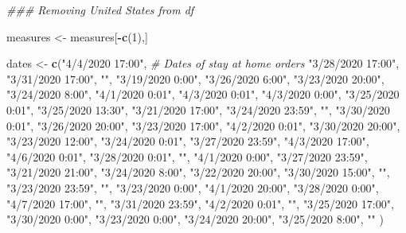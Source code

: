 \documentclass[
]{article}
\newenvironment{Shaded}{\begin{snugshade}}{\end{snugshade}}
\newcommand{\CommentTok}[1]{\textcolor[rgb]{0.56,0.35,0.01}{\textit{#1}}}
\newcommand{\DecValTok}[1]{\textcolor[rgb]{0.00,0.00,0.81}{#1}}
\newcommand{\KeywordTok}[1]{\textcolor[rgb]{0.13,0.29,0.53}{\textbf{#1}}}
\newcommand{\NormalTok}[1]{#1}
\newcommand{\OperatorTok}[1]{\textcolor[rgb]{0.81,0.36,0.00}{\textbf{#1}}}
\newcommand{\StringTok}[1]{\textcolor[rgb]{0.31,0.60,0.02}{#1}}
\begin{document}
\begin{Shaded}
\begin{Highlighting}[]
\CommentTok{### Removing United States from df}

\NormalTok{measures <-}\StringTok{ }\NormalTok{measures[}\OperatorTok{-}\KeywordTok{c}\NormalTok{(}\DecValTok{1}\NormalTok{),]}

\NormalTok{dates <-}\StringTok{ }\KeywordTok{c}\NormalTok{(}\StringTok{"4/4/2020 17:00"}\NormalTok{, }\CommentTok{# Dates of stay at home orders}
           \StringTok{"3/28/2020 17:00"}\NormalTok{,}
           \StringTok{"3/31/2020 17:00"}\NormalTok{,}
           \StringTok{""}\NormalTok{,}
           \StringTok{"3/19/2020 0:00"}\NormalTok{,}
           \StringTok{"3/26/2020 6:00"}\NormalTok{,}
           \StringTok{"3/23/2020 20:00"}\NormalTok{,}
           \StringTok{"3/24/2020 8:00"}\NormalTok{,}
           \StringTok{"4/1/2020 0:01"}\NormalTok{,}
           \StringTok{"4/3/2020 0:01"}\NormalTok{,}
           \StringTok{"4/3/2020 0:00"}\NormalTok{,}
           \StringTok{"3/25/2020 0:01"}\NormalTok{,}
           \StringTok{"3/25/2020 13:30"}\NormalTok{,}
           \StringTok{"3/21/2020 17:00"}\NormalTok{,}
           \StringTok{"3/24/2020 23:59"}\NormalTok{,}
           \StringTok{""}\NormalTok{,}
           \StringTok{"3/30/2020 0:01"}\NormalTok{,}
           \StringTok{"3/26/2020 20:00"}\NormalTok{,}
           \StringTok{"3/23/2020 17:00"}\NormalTok{,}
           \StringTok{"4/2/2020 0:01"}\NormalTok{,}
           \StringTok{"3/30/2020 20:00"}\NormalTok{,}
           \StringTok{"3/23/2020 12:00"}\NormalTok{,}
           \StringTok{"3/24/2020 0:01"}\NormalTok{,}
           \StringTok{"3/27/2020 23:59"}\NormalTok{,}
           \StringTok{"4/3/2020 17:00"}\NormalTok{,}
           \StringTok{"4/6/2020 0:01"}\NormalTok{,}
           \StringTok{"3/28/2020 0:01"}\NormalTok{,}
           \StringTok{""}\NormalTok{,}
           \StringTok{"4/1/2020 0:00"}\NormalTok{,}
           \StringTok{"3/27/2020 23:59"}\NormalTok{,}
           \StringTok{"3/21/2020 21:00"}\NormalTok{,}
           \StringTok{"3/24/2020 8:00"}\NormalTok{,}
           \StringTok{"3/22/2020 20:00"}\NormalTok{,}
           \StringTok{"3/30/2020 15:00"}\NormalTok{,}
           \StringTok{""}\NormalTok{,}
           \StringTok{"3/23/2020 23:59"}\NormalTok{,}
           \StringTok{""}\NormalTok{,}
           \StringTok{"3/23/2020 0:00"}\NormalTok{,}
           \StringTok{"4/1/2020 20:00"}\NormalTok{,}
           \StringTok{"3/28/2020 0:00"}\NormalTok{,}
           \StringTok{"4/7/2020 17:00"}\NormalTok{,}
           \StringTok{""}\NormalTok{,}
           \StringTok{"3/31/2020 23:59"}\NormalTok{,}
           \StringTok{"4/2/2020 0:01"}\NormalTok{,}
           \StringTok{""}\NormalTok{,}
           \StringTok{"3/25/2020 17:00"}\NormalTok{,}
           \StringTok{"3/30/2020 0:00"}\NormalTok{,}
           \StringTok{"3/23/2020 0:00"}\NormalTok{,}
           \StringTok{"3/24/2020 20:00"}\NormalTok{,}
           \StringTok{"3/25/2020 8:00"}\NormalTok{,}
           \StringTok{""}
\NormalTok{           )}


\end{Highlighting}
\end{Shaded}
\end{document}
